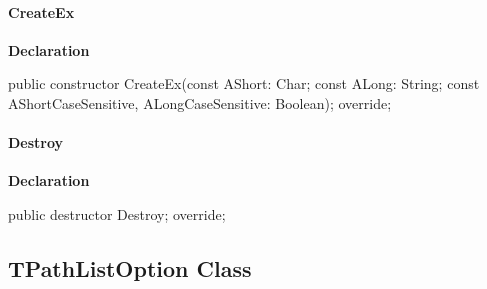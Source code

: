 \documentclass{report}
\newif\ifpdf
\begin{document}
\paragraph*{CreateEx}\hspace*{\fill}

\label{PasDoc_OptionParser.TStringOptionList-CreateEx}
\begin{list}{}{
\setlength{\itemindent}{0cm}
\setlength{\listparindent}{0cm}
\setlength{\leftmargin}{\evensidemargin}
\addtolength{\leftmargin}{\tmplength}
\settowidth{\labelsep}{X}
\addtolength{\leftmargin}{\labelsep}
\setlength{\labelwidth}{\tmplength}
}
\item[\textbf{Declaration}\hfill]
\ifpdf
\begin{flushleft}
\fi
\begin{ttfamily}
public constructor CreateEx(const AShort: Char; const ALong: String; const AShortCaseSensitive, ALongCaseSensitive: Boolean); override;\end{ttfamily}

\ifpdf
\end{flushleft}
\fi

\end{list}
\paragraph*{Destroy}\hspace*{\fill}

\label{PasDoc_OptionParser.TStringOptionList-Destroy}
\begin{list}{}{
\setlength{\itemindent}{0cm}
\setlength{\listparindent}{0cm}
\setlength{\leftmargin}{\evensidemargin}
\addtolength{\leftmargin}{\tmplength}
\settowidth{\labelsep}{X}
\addtolength{\leftmargin}{\labelsep}
\setlength{\labelwidth}{\tmplength}
}
\item[\textbf{Declaration}\hfill]
\ifpdf
\begin{flushleft}
\fi
\begin{ttfamily}
public destructor Destroy; override;\end{ttfamily}

\ifpdf
\end{flushleft}
\fi

\end{list}
\ifpdf
\subsection*{\large{\textbf{TPathListOption Class}}\normalsize\hspace{1ex}\hrulefill}
\else
\end{document}
